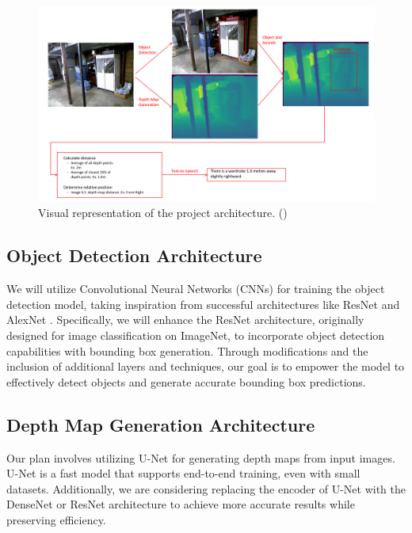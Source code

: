 \documentclass{article} %
\begin{document}
\begin{figure}[h]
\begin{center}
\includegraphics[width=1\textwidth]{Figs/Project Architecture.png}
\end{center}
\caption{Visual representation of the project architecture. (\cite{Silberman:ECCV12})}
\label{Project Architecture}
\end{figure}

\subsection{Object Detection Architecture}

We will utilize Convolutional Neural Networks (CNNs) for training the object detection model, taking inspiration from successful architectures like ResNet \cite{He2015} and AlexNet \cite{NIPS2012_4824}. Specifically, we will enhance the ResNet architecture, originally designed for image classification on ImageNet, to incorporate object detection capabilities with bounding box generation. Through modifications and the inclusion of additional layers and techniques, our goal is to empower the model to effectively detect objects and generate accurate bounding box predictions.


\subsection{Depth Map Generation Architecture}

Our plan involves utilizing U-Net \cite{RFB15a} for generating depth maps from input images. U-Net is a fast model that supports end-to-end training, even with small datasets. Additionally, we are considering replacing the encoder of U-Net with the DenseNet \cite{huang2017densely} or ResNet \cite{He2015} architecture to achieve more accurate results while preserving efficiency.
\end{document}

